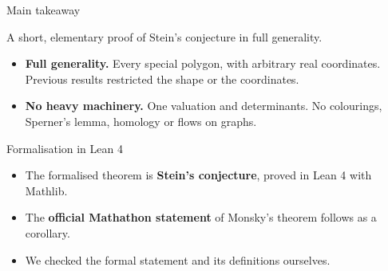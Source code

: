 \documentclass[aspectratio=169,11pt]{beamer}
\begin{document}
\begin{frame}{Main takeaway}
\vfill
\begin{center}
\large A short, elementary proof of Stein's conjecture in full generality.
\end{center}

\bigskip
\begin{itemize}
\item \textbf{Full generality.} Every special polygon, with arbitrary real coordinates. Previous results restricted the shape or the coordinates.
\medskip
\item \textbf{No heavy machinery.} One valuation and determinants. No colourings, Sperner's lemma, homology or flows on graphs.
\end{itemize}
\vfill
\end{frame}


\begin{frame}{Formalisation in Lean 4}
\vfill
\begin{itemize}
\item The formalised theorem is \textbf{Stein's conjecture}, proved in Lean 4 with Mathlib.
\bigskip
\item The \textbf{official Mathathon statement} of Monsky's theorem follows as a corollary.
\bigskip
\item We checked the formal statement and its definitions ourselves.
\end{itemize}
\vfill
\end{frame}
\end{document}
